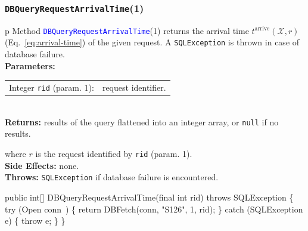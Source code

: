 \documentclass{article}
\def\nwendcode{\endtrivlist \endgroup}      %
\let\nwdocspar=\par
\theoremstyle{definition}                   %
\begin{document}
\subsubsection{{\tt{}\protect{}DBQueryRequestArrivalTime}(1)}
\begin{tabular}{p{\textwidth}}
\toprule
{}
Method \textcolor{blue}{{\tt{}\protect{}DBQueryRequestArrivalTime}}(1) returns the
arrival time $t^\textrm{arrive}(\mathcal{X},r)$
(Eq.~\ref{eq:arrival-time}) of the given request.
A {\tt{}SQLException} is thrown in case of database failure.\\
\midrule
\textbf{Parameters:}\\
\begin{tabular}{lp{116mm}}
Integer {\tt{}rid} (param. 1):&request identifier.
\end{tabular}\\
\textbf{Returns:} results of the query flattened into an integer array,
or {\tt{}null} if no results.


where $r$ is the request identified by {\tt{}rid} (param. 1).\\
\textbf{Side Effects:} none.\\
\textbf{Throws:} {\tt{}SQLException} if database failure is encountered.\\
\bottomrule
\end{tabular}
\nwenddocs{}\plusendmoddef
public int[] DBQueryRequestArrivalTime(final int rid) throws SQLException \{
  try (\LA{}Open \code{}conn\edoc{}~{\nwtagstyle{}}\RA{}) \{
    return DBFetch(conn, "S126", 1, rid);
  \} catch (SQLException e) \{
    throw e;
  \}
\}
\eatline
{}\nwendcode{}\nwdocspar
\end{document}
